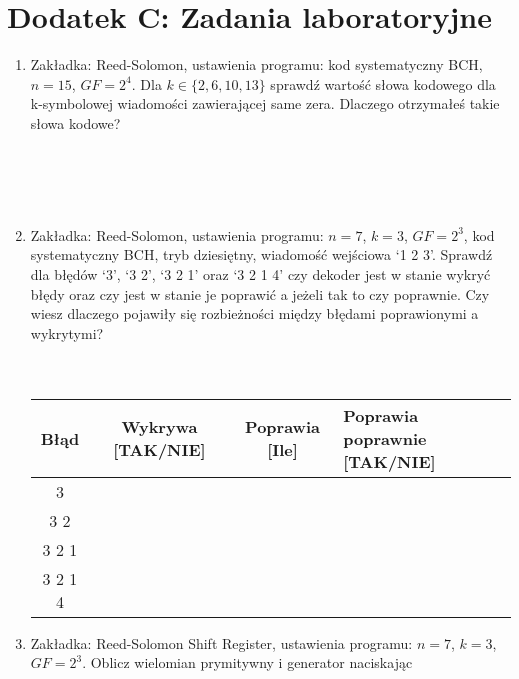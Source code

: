 \setcounter{secnumdepth}{0}
\section*{Dodatek C: Zadania laboratoryjne}

\begin{enumerate}
    \item Zakładka: Reed-Solomon, ustawienia programu: kod systematyczny BCH, $n=15$, $GF=2^4$.
    Dla $k \in \{ 2, 6, 10, 13 \}$ sprawdź wartość słowa kodowego dla k-symbolowej wiadomości zawierającej same zera. Dlaczego otrzymałeś takie słowa kodowe?\\ \\ \\ \\ \\
    \item Zakładka: Reed-Solomon, ustawienia programu: $n = 7$, $k = 3$, $GF = 2^3$,
    kod systematyczny BCH, tryb dziesiętny, wiadomość wejściowa `1 2 3'.
    Sprawdź dla błędów `3', `3 2', `3 2 1' oraz `3 2 1 4' czy dekoder jest w stanie
    wykryć błędy oraz czy jest w stanie je poprawić a jeżeli tak to czy poprawnie.
    Czy wiesz dlaczego pojawiły się rozbieżności między błędami poprawionymi a wykrytymi? \\ \\ \\
    \begin{table}[h]
        \renewcommand{\arraystretch}{1.8}
        \centering
        \begin{tabular}{|c|c|c|>{\centering\arraybackslash}p{5cm}|}
            \hline
            \textbf{Błąd} & \textbf{Wykrywa [TAK/NIE]} & \textbf{Poprawia [Ile]} & \textbf{Poprawia poprawnie [TAK/NIE]} \\
            \hline
            3 & & & \\
            \hline
            3 2 & & & \\
            \hline
            3 2 1 & & & \\
            \hline
            3 2 1 4 & & & \\
            \hline
        \end{tabular}\label{tab:rs2}
    \end{table}
    \item Zakładka: Reed-Solomon Shift Register, ustawienia programu:
    $n = 7$, $k = 3$, $GF = 2^3$. Oblicz wielomian prymitywny i generator naciskając

\end{enumerate}
